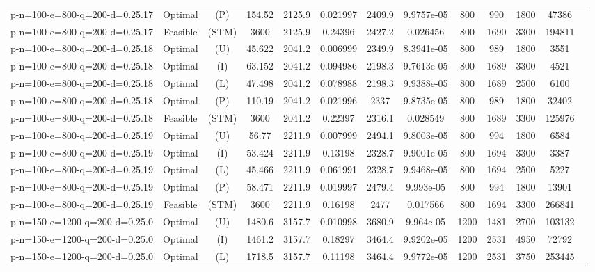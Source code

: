 \documentclass[landscape, a4paper]{article}
\newcommand{\STM}{\ensuremath{\mathrm{STM}}}
\newcommand{\Improved}{\ensuremath{\mathrm{I}}}
\newcommand{\Loose}{\ensuremath{\mathrm{L}}}
\newcommand{\Profit}{\ensuremath{\mathrm{P}}}
\newcommand{\Utility}{\ensuremath{\mathrm{U}}}
\begin{document}
\begin{center}
\begin{tabular}{lcccccccccccc}
p-n=100-e=800-q=200-d=0.25.17 & Optimal & (\Profit) & 154.52 & 2125.9 & 0.021997 & 2409.9 & 9.9757e-05 & 800 & 990 & 1800 & 47386 & \\
p-n=100-e=800-q=200-d=0.25.17 & Feasible & (\STM) & 3600 & 2125.9 & 0.24396 & 2427.2 & 0.026456 & 800 & 1690 & 3300 & 194811 & \\
p-n=100-e=800-q=200-d=0.25.18 & Optimal & (\Utility) & 45.622 & 2041.2 & 0.006999 & 2349.9 & 8.3941e-05 & 800 & 989 & 1800 & 3551 & \\
p-n=100-e=800-q=200-d=0.25.18 & Optimal & (\Improved) & 63.152 & 2041.2 & 0.094986 & 2198.3 & 9.7613e-05 & 800 & 1689 & 3300 & 4521 & \\
p-n=100-e=800-q=200-d=0.25.18 & Optimal & (\Loose) & 47.498 & 2041.2 & 0.078988 & 2198.3 & 9.9388e-05 & 800 & 1689 & 2500 & 6100 & \\
p-n=100-e=800-q=200-d=0.25.18 & Optimal & (\Profit) & 110.19 & 2041.2 & 0.021996 & 2337 & 9.8735e-05 & 800 & 989 & 1800 & 32402 & \\
p-n=100-e=800-q=200-d=0.25.18 & Feasible & (\STM) & 3600 & 2041.2 & 0.22397 & 2316.1 & 0.028549 & 800 & 1689 & 3300 & 125976 & \\
p-n=100-e=800-q=200-d=0.25.19 & Optimal & (\Utility) & 56.77 & 2211.9 & 0.007999 & 2494.1 & 9.8003e-05 & 800 & 994 & 1800 & 6584 & \\
p-n=100-e=800-q=200-d=0.25.19 & Optimal & (\Improved) & 53.424 & 2211.9 & 0.13198 & 2328.7 & 9.9001e-05 & 800 & 1694 & 3300 & 3387 & \\
p-n=100-e=800-q=200-d=0.25.19 & Optimal & (\Loose) & 45.466 & 2211.9 & 0.061991 & 2328.7 & 9.9468e-05 & 800 & 1694 & 2500 & 5227 & \\
p-n=100-e=800-q=200-d=0.25.19 & Optimal & (\Profit) & 58.471 & 2211.9 & 0.019997 & 2479.4 & 9.993e-05 & 800 & 994 & 1800 & 13901 & \\
p-n=100-e=800-q=200-d=0.25.19 & Feasible & (\STM) & 3600 & 2211.9 & 0.16198 & 2477 & 0.017566 & 800 & 1694 & 3300 & 266841 & \\
p-n=150-e=1200-q=200-d=0.25.0 & Optimal & (\Utility) & 1480.6 & 3157.7 & 0.010998 & 3680.9 & 9.964e-05 & 1200 & 1481 & 2700 & 103132 & \\
p-n=150-e=1200-q=200-d=0.25.0 & Optimal & (\Improved) & 1461.2 & 3157.7 & 0.18297 & 3464.4 & 9.9202e-05 & 1200 & 2531 & 4950 & 72792 & \\
p-n=150-e=1200-q=200-d=0.25.0 & Optimal & (\Loose) & 1718.5 & 3157.7 & 0.11198 & 3464.4 & 9.9772e-05 & 1200 & 2531 & 3750 & 253445 & \\

\end{tabular}
\end{center}
\end{document}
